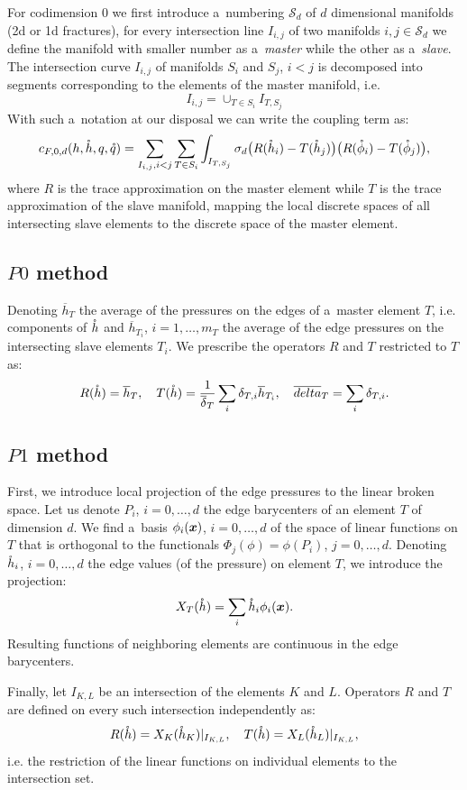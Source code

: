 For codimension 0 we first introduce a~numbering $\mathcal{S}_d$ of $d$ dimensional manifolds (2d or 1d fractures), for every intersection line $I_{i,j}$ 
of two manifolds  $i,j \in \mathcal{S}_d$ we define the manifold with smaller number as a~\emph{master} while the other as a~\emph{slave}. 
The intersection curve $I_{i,j}$ of manifolds $S_i$ and $S_j$, $i<j$ is decomposed into segments corresponding to the elements of the master manifold, i.e.
\[
    I_{i,j} =\cup_{T\in S_i} I_{T, S_j}
\]    
With such a~notation at our disposal we can write the coupling term as:
\begin{equation*}
  c_{F,0,d}(h, \mathring h, q, \mathring q) =  \sum_{I_{i,j}, i<j} \sum_{T\in S_i} \int_{I_{T, S_j}} \sigma_d
                \big(R({\mathring{h}_i}) - T({\mathring{h}_{j}}) \big)
                 \big(R({\mathring{\phi}_i}) - T({\mathring{\phi}_{j}}) \big),
\end{equation*}
where $R$ is the trace approximation on the master element while $T$ is the trace approximation of the slave manifold, mapping
the local discrete spaces of all intersecting slave elements to the discrete space of the master element.



\subsection{$P0$ method}
Denoting $\overline{h}_T$ the average of the pressures on the edges of a~master element $T$, i.e. components of $\mathring h$ and 
$\overline{h}_{T_i}$, $i=1,\dots,m_T$ the average of the edge pressures on the intersecting slave elements $T_i$. We prescribe the operators $R$ and $T$ restricted 
to $T$ as:
\[
    R(\mathring{h}) = \overline{h}_T,\quad   
    T(\mathring{h}) = \frac{1}{\overline{\delta}_T} \sum_{i} \delta_{T,i} \overline{h}_{T_i}, \quad
    \overline{delta}_T = \sum_{i} \delta_{T,i}. 
\]


\subsection{$P1$ method}
First, we introduce local projection of the edge pressures to the linear broken space. Let us denote $P_i$, $i=0,\dots,d$ the edge barycenters of an element $T$ 
of dimension $d$. We find a~basis $\phi_i(\mathbf{\boldsymbol{x}})$, $i=0,\dots,d$ of the space of linear functions on $T$ that is orthogonal to the functionals $\Phi_j(\phi)= \phi(P_i)$, 
$j=0,\dots, d$. Denoting $\mathring h_i$, $i=0,\dots, d$ the edge values (of the pressure) on element $T$, we introduce the projection:
\[
  X_T(\mathring h) = \sum_i \mathring h_i \phi_i(\mathbf{\boldsymbol{x}}).
\]
Resulting functions of neighboring elements are continuous in the edge barycenters.

Finally, let $I_{K,L}$ be an intersection of the elements $K$ and $L$. Operators $R$ and $T$ are defined on every such intersection independently
as:
\[
   R(\mathring{h}) = X_K(\mathring h_K)|_{I_{K,L}},\quad   
   T(\mathring{h}) = X_L(\mathring h_L)|_{I_{K,L}}, 
\]
i.e. the restriction of the linear functions on individual elements to the intersection set.

